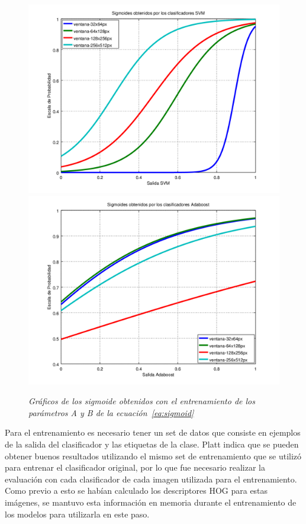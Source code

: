\begin{figure}[htc]
  \centering
  \includegraphics[scale=.4]{images/svmsig}
  \includegraphics[scale=.4]{images/boostsig}
  \caption{\em Gráficos de los sigmoide obtenidos con el entrenamiento de los parámetros A y B de la ecuación~\ref{eq:sigmoid}}  
  \label{fig:sigmoids}
\end{figure}


Para el entrenamiento es necesario tener un set de datos que consiste en ejemplos de la salida del clasificador y las etiquetas de la clase. Platt indica que se pueden obtener buenos resultados utilizando el mismo set de entrenamiento que se utilizó para entrenar el clasificador original, por lo que fue necesario realizar la evaluación con cada clasificador de cada imagen utilizada para el entrenamiento. Como previo a esto se habían calculado los descriptores HOG para estas imágenes, se mantuvo esta información en memoria durante el entrenamiento de los modelos para utilizarla en este paso.

